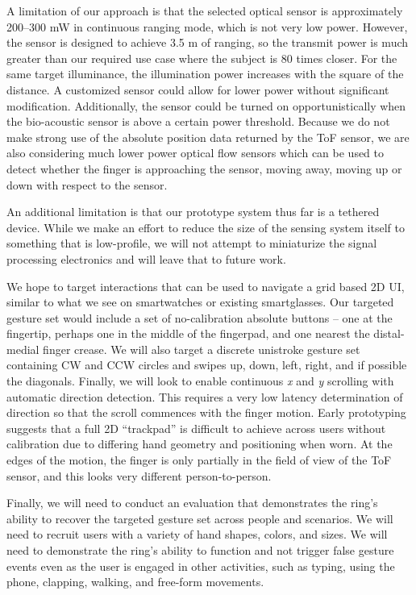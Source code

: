 \documentclass [11pt, proquest] {uwthesis}[2020/02/24]
\begin{document}
A limitation of our approach is that the selected optical sensor is approximately 200--300 mW in continuous ranging mode, which is not very low power. However, the sensor is designed to achieve 3.5 m of ranging, so the transmit power is much greater than our required use case where the subject is 80 times closer. For the same target illuminance, the illumination power increases with the square of the distance. A customized sensor could allow for lower power without significant modification. Additionally, the sensor could be turned on opportunistically when the bio-acoustic sensor is above a certain power threshold. Because we do not make strong use of the absolute position data returned by the ToF sensor, we are also considering much lower power optical flow sensors which can be used to detect whether the finger is approaching the sensor, moving away, moving up or down with respect to the sensor.

An additional limitation is that our prototype system thus far is a tethered device. While we make an effort to reduce the size of the sensing system itself to something that is low-profile, we will not attempt to miniaturize the signal processing electronics and will leave that to future work. 

We hope to target interactions that can be used to navigate a grid based 2D UI, similar to what we see on smartwatches or existing smartglasses. Our targeted gesture set would include  a set of no-calibration absolute buttons -- one at the fingertip, perhaps one in the middle of the fingerpad, and one nearest the distal-medial finger crease. We will also target a discrete unistroke gesture set containing CW and CCW circles and swipes up, down, left, right, and if possible the diagonals. Finally, we will look to enable continuous \textit{x} and \textit{y} scrolling with automatic direction detection. This requires a very low latency determination of direction so that the scroll commences with the finger motion. Early prototyping suggests that a full 2D “trackpad” is difficult to achieve across users without calibration due to differing hand geometry and positioning when worn. At the edges of the motion, the finger is only partially in the field of view of the ToF sensor, and this looks very different person-to-person.

Finally, we will need to conduct an evaluation that demonstrates the ring's ability to recover the targeted gesture set across people and scenarios. We will need to recruit users with a variety of hand shapes, colors, and sizes. We will need to demonstrate the ring's ability to function and not trigger false gesture events even as the user is engaged in other activities, such as typing, using the phone, clapping, walking, and free-form movements.
\end{document}
